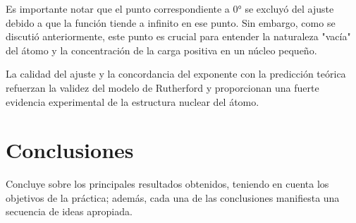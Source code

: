 \documentclass[twocolumn,a4paper,11pt]{scrartcl}
\begin{document}
Es importante notar que el punto correspondiente a 0° se excluyó del ajuste debido a que la función tiende a infinito en ese punto. Sin embargo, como se discutió anteriormente, este punto es crucial para entender la naturaleza "vacía" del átomo y la concentración de la carga positiva en un núcleo pequeño.

La calidad del ajuste y la concordancia del exponente con la predicción teórica refuerzan la validez del modelo de Rutherford y proporcionan una fuerte evidencia experimental de la estructura nuclear del átomo.

\section{Conclusiones}
Concluye sobre los principales resultados obtenidos, teniendo en cuenta los objetivos de la práctica; además, cada una de las conclusiones manifiesta una secuencia de ideas apropiada.



\end{document}
